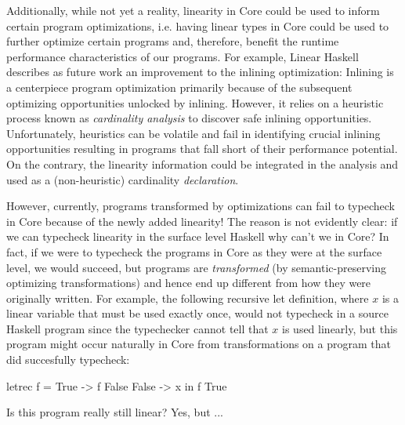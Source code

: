 \documentclass[]{lwnovathesis}
\begin{document}
Additionally, while not yet a reality, linearity in Core could be used to inform
certain program optimizations, i.e. having linear types in Core could be used to
further optimize certain programs and, therefore, benefit the runtime
performance characteristics of our programs. For example, Linear Haskell\cite{}
describes as future work an improvement to the inlining optimization: Inlining
is a centerpiece program optimization primarily because of the subsequent
optimizing opportunities unlocked by inlining. However, it relies on a heuristic
process known as \emph{cardinality analysis} to discover safe inlining
opportunities. Unfortunately, heuristics can be volatile and fail in identifying
crucial inlining opportunities resulting in programs that fall short of their
performance potential. On the contrary, the linearity information could be
integrated in the analysis and used as a (non-heuristic) cardinality
\emph{declaration}.

However, currently, programs transformed by optimizations can fail to typecheck
in Core because of the newly added linearity! The reason is not evidently clear:
if we can typecheck linearity in the surface level Haskell why can't we in Core?
In fact, if we were to typecheck the programs in Core as they were at the
surface level, we would succeed, but programs are \emph{transformed} (by
semantic-preserving optimizing transformations) and hence end up different from
how they were originally written. For example, the following recursive let
definition, where $x$ is a linear variable that must be used exactly once, would
not typecheck in a source Haskell program since the typechecker cannot tell that
$x$ is used linearly, but this program might occur naturally in Core from
transformations on a program that did succesfully typecheck:
\begin{code}
letrec f = \case
        True -> f False
        False -> x
in f True
\end{code}

Is this program really still linear? Yes, but ...



\end{document}
